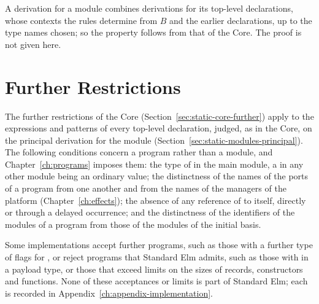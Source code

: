A derivation for a module combines derivations for its top-level declarations,
whose contexts the rules determine from $B$ and the earlier declarations, up
to the type names chosen; so the property follows from that of the Core. The
proof is not given here. %

\section{Further Restrictions}\label{sec:static-modules-further}

The further restrictions of the Core (Section~\ref{sec:static-core-further})
apply to the expressions and patterns of every top-level declaration, judged,
as in the Core, on the principal derivation for the module
(Section~\ref{sec:static-modules-principal}). %
The following conditions concern a program rather than a module, and
Chapter~\ref{ch:programs} imposes them: the type of  in the main
module, a  in any other module being an ordinary value; %
the distinctness of the names of the ports of a program from one another and
from the names of the managers of the platform
(Chapter~\ref{ch:effects}); %
the absence of any reference of  to itself, directly or through a
delayed occurrence; and the distinctness of the identifiers of the modules of
a program from those of the modules of the initial basis. %

Some implementations accept further programs, such as those with a further
type of flags for , or reject programs that Standard Elm admits, such
as those with  in a payload type, or those that exceed limits on
the sizes of records, constructors and functions. None of these acceptances
or limits is part of Standard Elm; each is recorded in
Appendix~\ref{ch:appendix-implementation}. %
